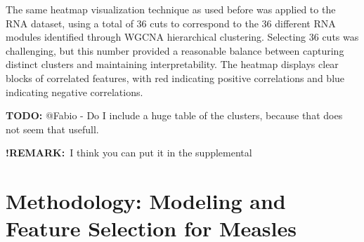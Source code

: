 \documentclass[12pt,a4paper]{report}
\newcommand{\todo}[1]{%
  \par\noindent%
  \begin{tcolorbox}[colback=yellow, colframe=black, boxrule=0.5pt, sharp corners, width=\linewidth, before skip=5pt, after skip=5pt]
    \textbf{TODO:} #1
  \end{tcolorbox}%
  \par
}
\newcommand{\remark}[1]{%
  \par\noindent%
  \begin{tcolorbox}[ colback=orange!20!white, colframe=orange!80!black, boxrule=0.5pt, sharp corners, width=\linewidth, ]
    {\textbf{\textcolor{orange!80!black}!REMARK:}}~#1
  \end{tcolorbox}%
}
\begin{document}
\noindent
The same heatmap visualization technique as used before was applied to the RNA dataset, using a total of 36 cuts to correspond to the 36 different RNA modules identified through WGCNA hierarchical clustering. Selecting 36 cuts was challenging, but this number provided a reasonable balance between capturing distinct clusters and maintaining interpretability. The heatmap displays clear blocks of correlated features, with red indicating positive correlations and blue indicating negative correlations.
\todo{@Fabio - Do I include a huge table of the clusters, because that does not seem that usefull.}

\remark{I think you can put it in the supplemental}






\chapter{Methodology: Modeling and Feature Selection for Measles}
\end{document}
